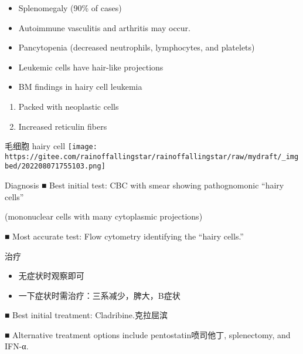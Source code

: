 \documentclass[
  ignorenonframetext,
]{beamer}
\begin{document}
\begin{frame}
\begin{itemize}
\item
  Splenomegaly (90\% of cases)
\item
  Autoimmune vasculitis and arthritis may occur.
\item
  Pancytopenia (decreased neutrophils, lymphocytes, and platelets)
\item
  Leukemic cells have hair-like projections
\item
  BM findings in hairy cell leukemia
\end{itemize}

\begin{enumerate}
[(1)]
\item
  Packed with neoplastic cells
\item
  Increased reticulin fibers
\end{enumerate}
\end{frame}

\begin{frame}
\begin{block}{毛细胞 hairy cell}
\protect\hypertarget{ux6bdbux7ec6ux80de-hairy-cell}{}
\texttt{[image: https://gitee.com/rainoffallingstar/rainoffallingstar/raw/mydraft/\_imgbed/202208071755103.png]}
\end{block}
\end{frame}

\begin{frame}
\begin{block}{Diagnosis}
\protect\hypertarget{diagnosis-3}{}
■ Best initial test: CBC with smear showing pathognomonic ``hairy
cells''

(mononuclear cells with many cytoplasmic projections)

■ Most accurate test: Flow cytometry identifying the ``hairy cells.''
\end{block}
\end{frame}

\begin{frame}
\begin{block}{治疗}
\protect\hypertarget{ux6cbbux7597-9}{}
\begin{itemize}
\item
  无症状时观察即可
\item
  一下症状时需治疗：三系减少，脾大，B症状
\end{itemize}

■ Best initial treatment: Cladribine.克拉屈滨

■ Alternative treatment options include pentostatin喷司他丁,
splenectomy, and IFN-α.
\end{block}
\end{frame}
\end{document}
